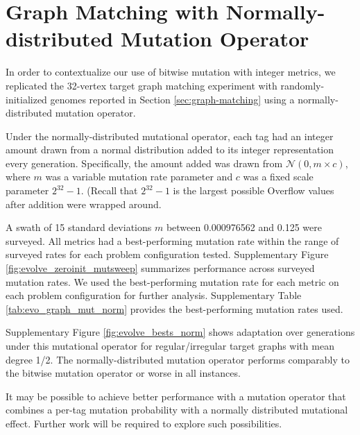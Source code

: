 \section{Graph Matching with Normally-distributed Mutation Operator}
\label{sec:graph-matching-norm}

In order to contextualize our use of bitwise mutation with integer metrics, we replicated the 32-vertex target graph matching experiment with randomly-initialized genomes reported in Section \ref{sec:graph-matching} using a normally-distributed mutation operator.

Under the normally-distributed mutational operator, each tag had an integer amount drawn from a normal distribution added to its integer representation every generation.
Specifically, the amount added was drawn from $\mathcal{N}(0, m \times c)$, where $m$ was a variable mutation rate parameter and $c$ was a fixed scale parameter $2^{32} - 1$.
(Recall that $2^{32} - 1$ is the largest possible
Overflow values after addition were wrapped around.

A swath of 15 standard deviations $m$ between 0.000976562 and 0.125 were surveyed.
All metrics had a best-performing mutation rate within the range of surveyed rates for each problem configuration tested.
Supplementary Figure \ref{fig:evolve_zeroinit_mutsweep} summarizes performance across surveyed mutation rates.
We used the best-performing mutation rate for each metric on each problem configuration for further analysis.
Supplementary Table \ref{tab:evo_graph_mut_norm} provides the best-performing mutation rates used.

Supplementary Figure \ref{fig:evolve_bests_norm} shows adaptation over generations under this mutational operator for regular/irregular target graphs with mean degree 1/2.
The normally-distributed mutation operator performs comparably to the bitwise mutation operator or worse in all instances.

It may be possible to achieve better performance with a mutation operator that combines a per-tag mutation probability with a normally distributed mutational effect.
Further work will be required to explore such possibilities.
